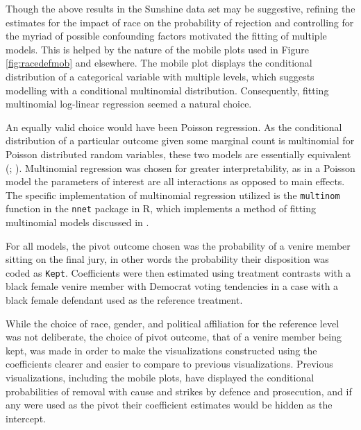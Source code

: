 Though the above results in the Sunshine data set may be suggestive, refining the estimates for the impact of race on the
probability of rejection and controlling for the myriad of possible confounding factors motivated the fitting of multiple
models. This is helped by the nature of the mobile plots used in
Figure \ref{fig:racedefmob} and elsewhere. The mobile plot displays the
conditional distribution of a categorical variable with multiple levels, which suggests modelling with a conditional multinomial
distribution. Consequently, fitting multinomial log-linear regression seemed a natural choice.

An equally valid choice would have been Poisson regression. As the conditional distribution of a
particular outcome given some marginal count is multinomial for
Poisson distributed random variables, these two models are essentially
equivalent (\cite{baker1994}; \cite{lang1996}). Multinomial regression was chosen for greater interpretability, as in a Poisson model the parameters of
interest are all interactions as opposed to main effects. The specific implementation of multinomial regression utilized is the
\texttt{multinom} function in the \texttt{nnet} package in R, which implements a method of fitting multinomial models discussed
in \cite{nnet}.

For all models, the pivot outcome chosen was the probability of a
venire member sitting on the final jury, in other words the probability their disposition was coded as \texttt{Kept}. Coefficients were
then estimated using treatment contrasts with a black female venire member with Democrat voting tendencies in a case with a black female
defendant used as the reference treatment.

While the choice of race, gender, and political affiliation for the reference level was not deliberate, the choice of pivot
outcome, that of a venire member being kept, was made in order to make the visualizations constructed using the coefficients
clearer and easier to compare to previous visualizations. Previous visualizations, including the mobile plots, have displayed the
conditional probabilities of removal with cause and strikes by defence and prosecution, and if any were used as the pivot their
coefficient estimates would be hidden as the intercept.

